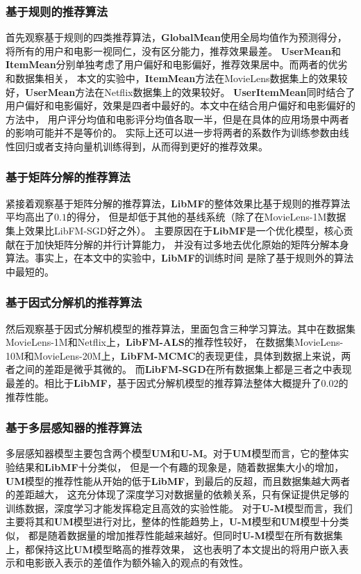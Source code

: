 \subsubsection{基于规则的推荐算法}
首先观察基于规则的四类推荐算法，\textbf{GlobalMean}使用全局均值作为预测得分，将所有的用户和电影一视同仁，没有区分能力，推荐效果最差。
\textbf{UserMean}和\textbf{ItemMean}分别单独考虑了用户偏好和电影偏好，推荐效果居中。而两者的优劣和数据集相关，
本文的实验中，\textbf{ItemMean}方法在MovieLens数据集上的效果较好，\textbf{UserMean}方法在Netflix数据集上的效果较好。
\textbf{UserItemMean}同时结合了用户偏好和电影偏好，效果是四者中最好的。本文中在结合用户偏好和电影偏好的方法中，
用户评分均值和电影评分均值各取一半，但是在具体的应用场景中两者的影响可能并不是等价的。
实际上还可以进一步将两者的系数作为训练参数由线性回归或者支持向量机训练得到，从而得到更好的推荐效果。

\subsubsection{基于矩阵分解的推荐算法}
紧接着观察基于矩阵分解的推荐算法，\textbf{LibMF}的整体效果比基于规则的推荐算法平均高出了$0.1$的得分，
但是却低于其他的基线系统（除了在MovieLens-1M数据集上效果比LibFM-SGD好之外）。
主要原因在于\textbf{LibMF}是一个优化模型，核心贡献在于加快矩阵分解的并行计算能力，
并没有过多地去优化原始的矩阵分解本身算法。事实上，在本文中的实验中，\textbf{LibMF}的训练时间
是除了基于规则外的算法中最短的。

\subsubsection{基于因式分解机的推荐算法}
然后观察基于因式分解机模型的推荐算法，里面包含三种学习算法。其中在数据集MovieLens-1M和Netflix上，\textbf{LibFM-ALS}的推荐性较好，
在数据集MovieLens-10M和MovieLens-20M上，\textbf{LibFM-MCMC}的表现更佳，具体到数据上来说，两者之间的差距是微乎其微的。
而\textbf{LibFM-SGD}在所有数据集上都是三者之中表现最差的。相比于\textbf{LibMF}，基于因式分解机模型的推荐算法整体大概提升了$0.02$的推荐性能。

\subsubsection{基于多层感知器的推荐算法}
多层感知器模型主要包含两个模型\textbf{UM}和\textbf{U-M}。对于\textbf{UM}模型而言，它的整体实验结果和\textbf{LibMF}十分类似，
但是一个有趣的现象是，随着数据集大小的增加，\textbf{UM}模型的推荐性能从开始的低于\textbf{LibMF}，到最后的反超，而且数据集越大两者的差距越大，
这充分体现了深度学习对数据量的依赖关系，只有保证提供足够的训练数据，深度学习才能发挥稳定且高效的实验性能。
对于\textbf{U-M}模型而言，我们主要将其和\textbf{UM}模型进行对比，整体的性能趋势上，\textbf{U-M}模型和\textbf{UM}模型十分类似，
都是随着数据量的增加推荐性能越来越好。但同时\textbf{U-M}模型在所有数据集上，都保持这比\textbf{UM}模型略高的推荐效果，
这也表明了本文提出的将用户嵌入表示和电影嵌入表示的差值作为额外输入的观点的有效性。

